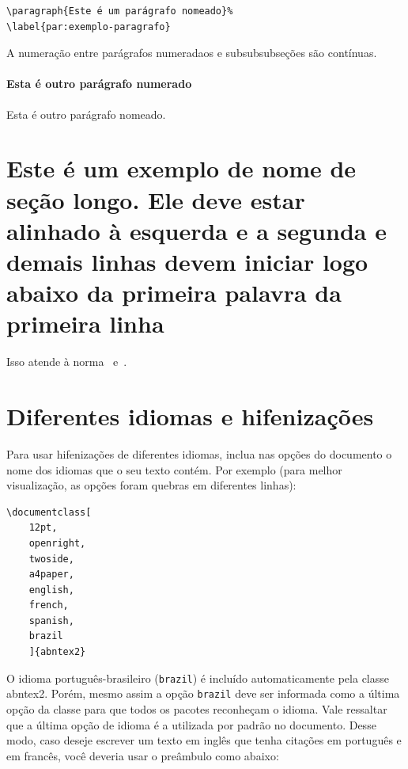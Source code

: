 \begin{verbatim}
\paragraph{Este é um parágrafo nomeado}%
\label{par:exemplo-paragrafo}
\end{verbatim}

A numeração entre parágrafos numeradaos e subsubsubseções são contínuas.

\paragraph{Esta é outro parágrafo numerado}%
\label{par:exemplo-paragrafo-outro}

Esta é outro parágrafo nomeado.

\section{Este é um exemplo de nome de seção longo. Ele deve estar
  alinhado à esquerda e a segunda e demais linhas devem iniciar logo abaixo da
  primeira palavra da primeira linha}

Isso atende à norma~
e~.

\section{Diferentes idiomas e hifenizações}%
\label{sec:hifenizacao}

Para usar hifenizações de diferentes idiomas, inclua nas opções do documento o
nome dos idiomas que o seu texto contém. Por exemplo (para melhor
visualização, as opções foram quebras em diferentes linhas):

\begin{verbatim}
\documentclass[
    12pt,
    openright,
    twoside,
    a4paper,
    english,
    french,
    spanish,
    brazil
    ]{abntex2}
\end{verbatim}

O idioma português-brasileiro (\texttt{brazil}) é incluído automaticamente pela
classe \textsf{abntex2}. Porém, mesmo assim a opção \texttt{brazil} deve ser
informada como a última opção da classe para que todos os pacotes reconheçam o
idioma. Vale ressaltar que a última opção de idioma é a utilizada por padrão no
documento. Desse modo, caso deseje escrever um texto em inglês que tenha
citações em português e em francês, você deveria usar o preâmbulo como abaixo:

